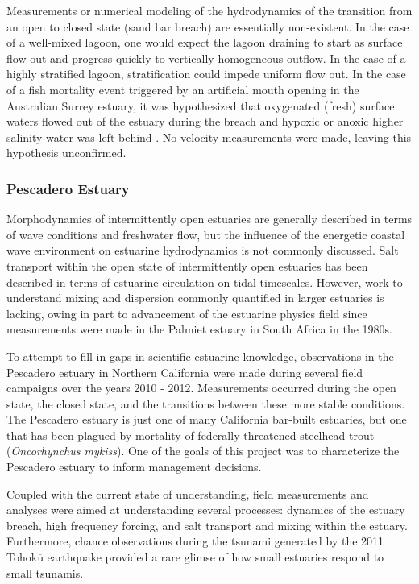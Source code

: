 Measurements or numerical modeling of the hydrodynamics of the transition from an open to closed state (sand bar breach) are essentially non-existent. In the case of a well-mixed lagoon, one would expect the lagoon draining to start as surface flow out and progress quickly to vertically homogeneous outflow.  In the case of a highly stratified lagoon, stratification could impede uniform flow out. In the case of a fish mortality event triggered by an artificial mouth opening in the Australian Surrey estuary, it was hypothesized that oxygenated (fresh) surface waters flowed out of the estuary during the breach and hypoxic or anoxic higher salinity water was left behind \parencite{becker_artificial_2009}. No velocity measurements were made, leaving this hypothesis unconfirmed.

\subsubsection{Pescadero Estuary} 
Morphodynamics of intermittently open estuaries are generally described in terms of wave conditions and freshwater flow, but the influence of the energetic coastal wave environment on estuarine hydrodynamics is not commonly discussed. Salt transport within the open state of intermittently open estuaries has been described in terms of estuarine circulation on tidal timescales. However, work to understand mixing and dispersion commonly quantified in larger estuaries is lacking, owing in part to advancement of the estuarine physics field since measurements were made in the Palmiet estuary in South Africa in the 1980s. 


To attempt to fill in gaps in scientific estuarine knowledge, observations in the Pescadero estuary in Northern California were made during several field campaigns over the years 2010 - 2012. Measurements occurred during the open state, the closed state, and the transitions between these more stable conditions. The Pescadero estuary is just one of many California bar-built estuaries, but one that has been plagued by mortality of federally threatened steelhead trout (\emph{Oncorhynchus mykiss}). One of the goals of this project was to characterize the Pescadero estuary to inform management decisions. 

Coupled with the current state of understanding, field measurements and analyses were aimed at understanding several processes: dynamics of the estuary breach, high frequency forcing, and salt transport and mixing within the estuary. Furthermore, chance observations during the tsunami generated by the 2011 Tohok$\overline{\mathrm{u}}$ earthquake provided a rare glimse of how small estuaries respond to small tsunamis. 

